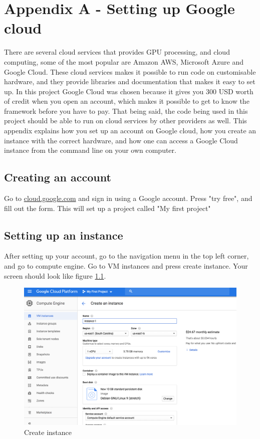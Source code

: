 \chapter{Appendix A - Setting up Google cloud}
\label{ap_gcloud}
There are several cloud services that provides GPU processing, and cloud computing, some of the most popular are Amazon AWS, Microsoft Azure and Google Cloud. These cloud services makes it possible to run code on customisable hardware, and they provide libraries and documentation that makes it easy to set up. In this project Google Cloud was chosen because it gives you 300 USD worth of credit when you open an account, which makes it possible to get to know the framework before you have to pay. That being said, the code being used in this project should be able to run on cloud services by other providers as well. This appendix explains how you set up an account on Google cloud, how you create an instance with the correct hardware, and how one can access a Google Cloud instance from the command line on your own computer. 

\section{Creating an account}
Go to \url{cloud.google.com} and sign in using a Google account. Press "try free", and fill out the form. This will set up a project called "My first project"

\section{Setting up an instance}
After setting up your account, go to the navigation menu in the top left corner, and go to compute engine. Go to VM instances and press create instance. Your screen should look like figure \ref{fig:create_instance1}.

\begin{figure}
    \centering
    \includegraphics[scale=0.35]{images/create_instance1.png}
    \caption{Create instance}
    \label{fig:create_instance1}
\end{figure}

